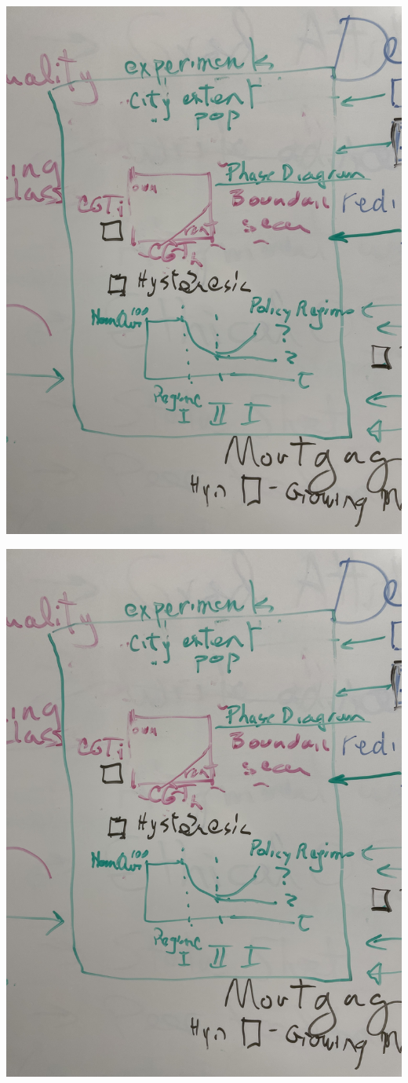 \documentclass[12pt]{article}
\begin{document}
\includegraphics[scale=.5, angle=-90]{IMG_2690.jpg}

\includegraphics[scale=.5, angle=-90]{IMG_2690.jpg}
\end{document}
